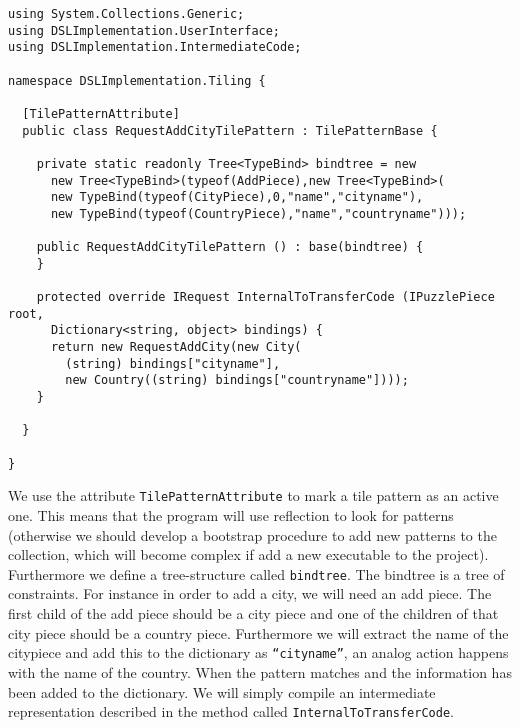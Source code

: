\begin{lstlisting}
using System.Collections.Generic;
using DSLImplementation.UserInterface;
using DSLImplementation.IntermediateCode;

namespace DSLImplementation.Tiling {

  [TilePatternAttribute]
  public class RequestAddCityTilePattern : TilePatternBase {

    private static readonly Tree<TypeBind> bindtree = new
      new Tree<TypeBind>(typeof(AddPiece),new Tree<TypeBind>(
      new TypeBind(typeof(CityPiece),0,"name","cityname"),
      new TypeBind(typeof(CountryPiece),"name","countryname")));

    public RequestAddCityTilePattern () : base(bindtree) {
    }

    protected override IRequest InternalToTransferCode (IPuzzlePiece root,
      Dictionary<string, object> bindings) {
      return new RequestAddCity(new City(
        (string) bindings["cityname"],
        new Country((string) bindings["countryname"])));
    }

  }

}
\end{lstlisting}
We use the attribute \texttt{TilePatternAttribute} to mark a tile pattern as an
active one. This means that the program will use reflection to look for
patterns (otherwise we should develop a bootstrap procedure to add new
patterns to the collection, which will become complex if add a new executable
to the project). Furthermore we define a tree-structure called
\texttt{bindtree}. The bindtree is a tree of constraints. For instance in order
to add a city, we will need an add piece. The first child of the add piece
should be a city piece and one of the children of that city piece should be a
country piece. Furthermore we will extract the name of the citypiece and add
this to the dictionary as \texttt{``cityname''}, an analog action happens with
the name of the country. When the pattern matches and the information has been
added to the dictionary. We will simply compile an intermediate representation
described in the method called \texttt{InternalToTransferCode}.